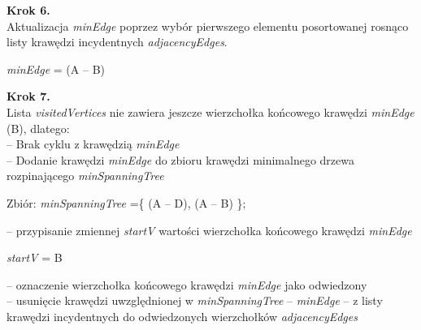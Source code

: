 \textbf{Krok 6.}\\
Aktualizacja \emph{minEdge} poprzez wybór pierwszego elementu posortowanej rosnąco listy krawędzi incydentnych \emph{adjacencyEdges}.\\
\begin{center}
	\emph{minEdge} = (A -- B)
\end{center}

\textbf{Krok 7.}\\
Lista \emph{visitedVertices} nie zawiera jeszcze wierzchołka końcowego krawędzi \emph{minEdge} (B), dlatego:\\
-- Brak cyklu z krawędzią \emph{minEdge}\\
-- Dodanie krawędzi \emph{minEdge} do zbioru krawędzi minimalnego drzewa rozpinającego \emph{minSpanningTree}
\begin{center}
	Zbiór: \emph{minSpanningTree} =\{ (A -- D), (A -- B) \};
\end{center}
-- przypisanie zmiennej \emph{startV} wartości wierzchołka końcowego krawędzi \emph{minEdge}
\begin{center}
	\emph{startV} = B
\end{center}
-- oznaczenie wierzchołka końcowego krawędzi \emph{minEdge } jako odwiedzony \\
-- usunięcie krawędzi uwzględnionej w \emph{minSpanningTree} -- \emph{minEdge} -- z listy krawędzi incydentnych do odwiedzonych wierzchołków \emph{adjacencyEdges}

